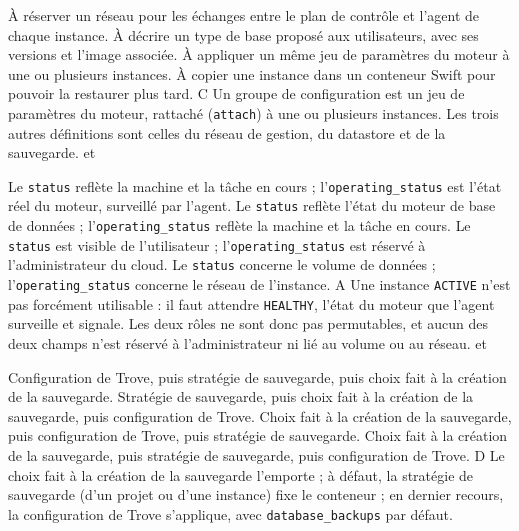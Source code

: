   {À réserver un réseau pour les échanges entre le plan de contrôle et l'agent de chaque instance.}
  {À décrire un type de base proposé aux utilisateurs, avec ses versions et l'image associée.}
  {À appliquer un même jeu de paramètres du moteur à une ou plusieurs instances.}
  {À copier une instance dans un conteneur Swift pour pouvoir la restaurer plus tard.}
  {C}
  {Un groupe de configuration est un jeu de paramètres du moteur, rattaché (\texttt{attach}) à une ou plusieurs instances. Les trois autres définitions sont celles du réseau de gestion, du datastore et de la sauvegarde.}
  { et }

  {Le \texttt{status} reflète la machine et la tâche en cours ; l'\texttt{operating\_status} est l'état réel du moteur, surveillé par l'agent.}
  {Le \texttt{status} reflète l'état du moteur de base de données ; l'\texttt{operating\_status} reflète la machine et la tâche en cours.}
  {Le \texttt{status} est visible de l'utilisateur ; l'\texttt{operating\_status} est réservé à l'administrateur du cloud.}
  {Le \texttt{status} concerne le volume de données ; l'\texttt{operating\_status} concerne le réseau de l'instance.}
  {A}
  {Une instance \texttt{ACTIVE} n'est pas forcément utilisable : il faut attendre \texttt{HEALTHY}, l'état du moteur que l'agent surveille et signale. Les deux rôles ne sont donc pas permutables, et aucun des deux champs n'est réservé à l'administrateur ni lié au volume ou au réseau.}
  { et }

  {Configuration de Trove, puis stratégie de sauvegarde, puis choix fait à la création de la sauvegarde.}
  {Stratégie de sauvegarde, puis choix fait à la création de la sauvegarde, puis configuration de Trove.}
  {Choix fait à la création de la sauvegarde, puis configuration de Trove, puis stratégie de sauvegarde.}
  {Choix fait à la création de la sauvegarde, puis stratégie de sauvegarde, puis configuration de Trove.}
  {D}
  {Le choix fait à la création de la sauvegarde l'emporte ; à défaut, la stratégie de sauvegarde (d'un projet ou d'une instance) fixe le conteneur ; en dernier recours, la configuration de Trove s'applique, avec \texttt{database\_backups} par défaut.}
  {}

